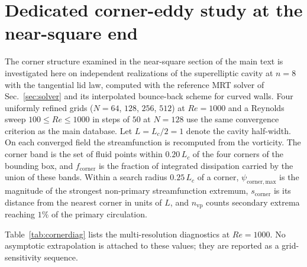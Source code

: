 \documentclass[11pt]{article}
\begin{document}
\section{Dedicated corner-eddy study at the near-square end}\label{sec:corner}

The corner structure examined in the near-square section of the main text is
investigated here on independent realizations of the superelliptic cavity at
$n=8$ with the tangential lid law, computed with the reference MRT solver of
Sec.~\ref{sec:solver} and its interpolated bounce-back scheme for curved walls.
Four uniformly refined grids ($N=64$, $128$, $256$, $512$) at $Re=1000$ and a
Reynolds sweep $100\le Re\le1000$ in steps of $50$ at $N=128$ use the same
convergence criterion as the main database. Let $L=L_c/2=1$ denote the cavity
half-width. On each converged field the streamfunction is recomputed from the
vorticity. The corner band is the set of fluid points within $0.20\,L_c$ of the
four corners of the bounding box, and $f_{\mathrm{corner}}$ is the fraction of
integrated dissipation carried by the union of these bands. Within a search
radius $0.25\,L_c$ of a corner, $\psi_{\mathrm{corner,max}}$ is the magnitude of
the strongest non-primary streamfunction extremum, $s_{\mathrm{corner}}$ is its
distance from the nearest corner in units of $L$, and $n_{\mathrm{vp}}$ counts
secondary extrema reaching $1\%$ of the primary circulation.

Table~\ref{tab:cornerdiag} lists the multi-resolution diagnostics at $Re=1000$.
No asymptotic extrapolation is attached to these values; they are reported as a
grid-sensitivity sequence.
\end{document}
